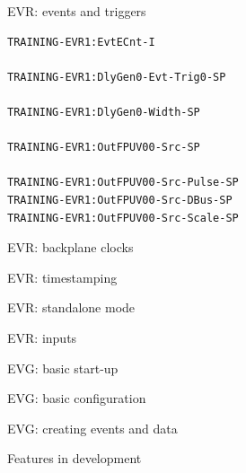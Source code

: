 \documentclass[
  9pt
  , table
  , ignorenonframetext
]{beamer}
\begin{document}
\begin{frame}[fragile]{EVR: events and triggers}
\begin{lstlisting}[style=termstyle,breaklines=true,basicstyle=\scriptsize]
TRAINING-EVR1:EvtECnt-I

TRAINING-EVR1:DlyGen0-Evt-Trig0-SP

TRAINING-EVR1:DlyGen0-Width-SP

TRAINING-EVR1:OutFPUV00-Src-SP

TRAINING-EVR1:OutFPUV00-Src-Pulse-SP
TRAINING-EVR1:OutFPUV00-Src-DBus-SP
TRAINING-EVR1:OutFPUV00-Src-Scale-SP

\end{lstlisting}
\end{frame}

\begin{frame}{EVR: backplane clocks}
\end{frame}
\begin{frame}{EVR: timestamping}
\end{frame}
\begin{frame}{EVR: standalone mode}
\end{frame}
\begin{frame}{EVR: inputs}
\end{frame}
\begin{frame}{EVG: basic start-up}
\end{frame}
\begin{frame}{EVG: basic configuration}
\end{frame}
\begin{frame}{EVG: creating events and data}
\end{frame}
\begin{frame}{Features in development}
\end{frame}
\end{document}
